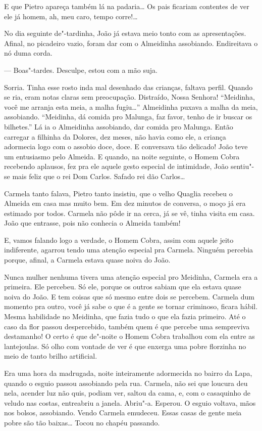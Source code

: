 \begin{linenumbers}
E que Pietro apareça também lá na padaria\ldots{} Os pais ficariam contentes
de ver ele já homem, ah, meu caro, tempo corre!\ldots{}

No dia seguinte de"-tardinha, João já estava meio tonto com as
apresentações. Afinal, no picadeiro vazio, foram dar com o Almeidinha
assobiando. Endireitava o nó duma corda.

--- Boas"-tardes. Desculpe, estou com a mão suja.

Sorria. Tinha esse rosto inda mal desenhado das crianças, faltava
perfil. Quando se ria, eram notas claras sem preocupação. Distraído,
Nossa Senhora! ``Meidinha, você me arranja esta meia, a malha fugiu\ldots{}''
Almeidinha puxava a malha da meia, assobiando. ``Meidinha, dá comida pro
Malunga, faz favor, tenho de ir buscar os bilhetes.'' Lá ia o Almeidinha
assobiando, dar comida pro Malunga. Então carregar a filhinha da
Dolores, dez meses, não havia como ele, a criança adormecia logo com o
assobio doce, doce. E conversava tão delicado! João teve um entusiasmo
pelo Almeida. E quando, na noite seguinte, o Homem Cobra recebendo
aplausos, fez pra ele aquele gesto especial de intimidade, João
sentiu"-se mais feliz que o rei Dom Carlos. Safado rei dão Carlos\ldots{}

Carmela tanto falava, Pietro tanto insistiu, que o velho Quaglia recebeu
o Almeida em casa mas muito bem. Em dez minutos de conversa, o moço já
era estimado por todos. Carmela não pôde ir na cerca, já se vê, tinha
visita em casa. João que entrasse, pois não conhecia o Almeida também!

E, vamos falando logo a verdade, o Homem Cobra, assim com aquele jeito
indiferente, agarrou tendo uma atenção especial pra Carmela. Ninguém
percebia porque, afinal, a Carmela estava quase noiva do João.

Nunca mulher nenhuma tivera uma atenção especial pro Meidinha, Carmela
era a primeira. Ele percebeu. Só ele, porque os outros sabiam que ela
estava quase noiva do João. E tem coisas que só mesmo entre dois se
percebem. Carmela dum momento pra outro, você já sabe o que é a gente se
tornar criminoso, ficara hábil. Mesma habilidade no Meidinha, que fazia
tudo o que ela fazia primeiro. Até o caso da flor passou despercebido,
também quem é que percebe uma sempreviva destamanho! O certo é que
de"-noite o Homem Cobra trabalhou com ela entre as lantejoulas. Só olho
com vontade de ver é que enxerga uma pobre florzinha no meio de tanto
brilho artificial.

Era uma hora da madrugada, noite inteiramente adormecida no bairro da
Lapa, quando o esguio passou assobiando pela rua. Carmela, não sei que
loucura deu nela, acender luz não quis, podiam ver, saltou da cama, e,
com o casaquinho de veludo nas costas, entreabriu a janela. Abriu"-a.
Esperou. O esguio voltava, mãos nos bolsos, assobiando. Vendo Carmela
emudeceu. Essas casas de gente meia pobre são tão baixas\ldots{} Tocou no
chapéu passando.


\end{linenumbers}
